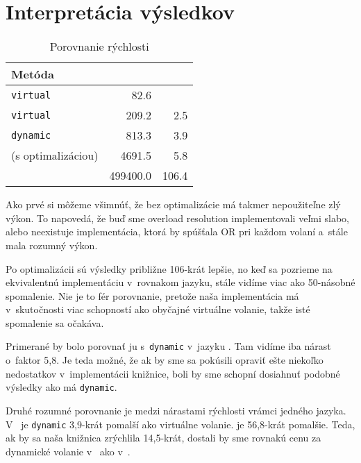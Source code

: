 \section{Interpretácia výsledkov}

\begin{table}[H]
\centering
\begin{tabular}{l@{\hspace{1.2cm}}D{.}{,}{6.1}D{.}{,}{3.1}}
\toprule
\textbf{Metóda} &  &  \\
\midrule
\Cpp{} \texttt{virtual}            &     82.6 & \mc{---} \\
\Csharp{} \texttt{virtual}         &    209.2 &     2.5 \\
\Csharp{} \texttt{dynamic}         &    813.3 &     3.9 \\
\PPreflection{} (s optimalizáciou) &   4691.5 &     5.8 \\
\PPreflection{}                    & 499400.0 &   106.4 \\
\bottomrule
\end{tabular}
\caption{Porovnanie rýchlosti \PPreflection{}}\label{tab2}
\end{table}

Ako prvé si môžeme všimnúť, že bez optimalizácie má \PPreflection{} takmer nepoužiteľne zlý výkon. To napovedá, že buď sme overload resolution implementovali veľmi slabo, alebo neexistuje implementácia, ktorá by spúšťala OR pri každom volaní a~stále mala rozumný výkon.

Po optimalizácii sú výsledky približne 106-krát lepšie, no keď sa pozrieme na ekvivalentnú implementáciu v~rovnakom jazyku, stále vidíme viac ako 50-násobné spomalenie. Nie je to fér porovnanie, pretože naša implementácia má v~skutočnosti viac schopností ako obyčajné virtuálne volanie, takže isté spomalenie sa očakáva.

Primerané by bolo porovnať ju s~\texttt{dynamic} v~jazyku \Csharp{}. Tam vidíme iba nárast o~faktor 5,8. Je teda možné, že ak by sme sa pokúsili opraviť ešte niekoľko nedostatkov v~implementácii knižnice, boli by sme schopní dosiahnuť podobné výsledky ako má \Csharp{} \texttt{dynamic}.

Druhé rozumné porovnanie je medzi nárastami rýchlosti vrámci jedného jazyka. V~\Csharp{} je \texttt{dynamic} 3,9-krát pomalší ako virtuálne volanie. \PPreflection{} je 56,8-krát pomalšie. Teda, ak by sa naša knižnica zrýchlila 14,5-krát, dostali by sme rovnakú cenu za dynamické volanie v~\Cpp{} ako v~\Csharp{}.
